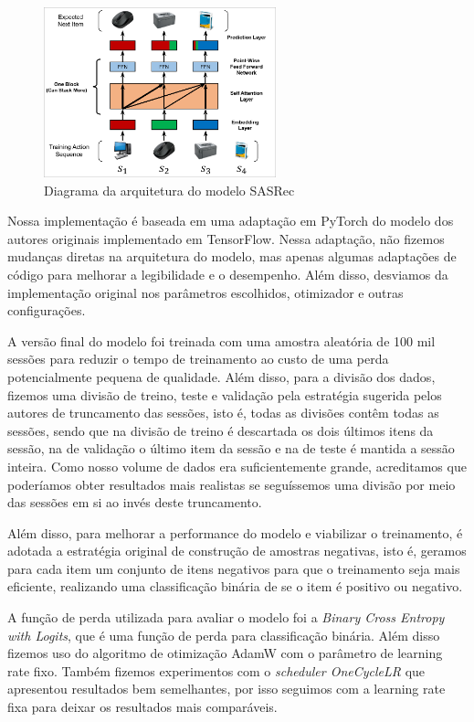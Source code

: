 \begin{figure}[H]
    \centering
    \includegraphics[width=0.6\textwidth]{../assets/sasrec-diagram.png}
    \caption{Diagrama da arquitetura do modelo SASRec \cite{sasrec}}
    \label{fig:sasrec-diagram}
\end{figure}

Nossa implementação é baseada em uma adaptação \cite{seanswyi} em
PyTorch do modelo dos autores originais implementado em TensorFlow.
Nessa adaptação, não fizemos mudanças diretas na arquitetura do
modelo, mas apenas algumas adaptações de código para melhorar a
legibilidade e o desempenho. Além disso, desviamos da implementação original 
nos parâmetros escolhidos, otimizador e outras configurações.

A versão final do modelo foi treinada com uma amostra aleatória
de 100 mil sessões para reduzir o tempo de treinamento ao custo
de uma perda potencialmente pequena de qualidade. Além disso,
para a divisão dos dados, fizemos uma divisão de treino, teste
e validação pela estratégia sugerida pelos autores de truncamento
das sessões, isto é, todas as divisões contêm todas as sessões,
sendo que na divisão de treino é descartada os dois últimos itens
da sessão, na de validação o último item da sessão e na de teste
é mantida a sessão inteira. Como nosso volume de dados era
suficientemente grande, acreditamos que poderíamos obter resultados
mais realistas se seguíssemos uma divisão por meio das sessões em
si ao invés deste truncamento.

Além disso, para melhorar a performance do modelo e viabilizar o treinamento,
é adotada a estratégia original de construção de amostras negativas, isto é,
geramos para cada item um conjunto de itens negativos para que o
treinamento seja mais eficiente, realizando uma classificação
binária de se o item é positivo ou negativo.

A função de perda utilizada para avaliar o modelo foi a 
\textit{Binary Cross Entropy with Logits}, que é uma função de perda
para classificação binária. Além disso fizemos uso do algoritmo
de otimização AdamW \cite{adamw} com o parâmetro de learning rate
fixo. Também fizemos experimentos com o \textit{scheduler OneCycleLR} 
\cite{onecyclelr} que apresentou resultados bem semelhantes, por isso
seguimos com a learning rate fixa para deixar os resultados mais comparáveis.

